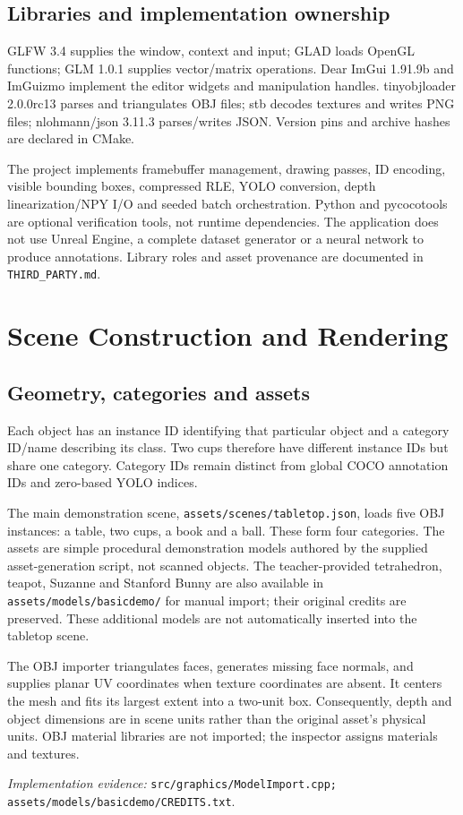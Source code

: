 \documentclass[12pt,a4paper]{article}
\newcommand{\code}[1]{{\small\nolinkurl{#1}}}
\newcommand{\source}[1]{\par{\raggedright\footnotesize\textit{Implementation evidence:} \code{#1}.\par}}
\begin{document}
\subsection{Libraries and implementation ownership}
GLFW 3.4 supplies the window, context and input; GLAD loads OpenGL functions; GLM 1.0.1 supplies vector/matrix operations. Dear ImGui 1.91.9b and ImGuizmo implement the editor widgets and manipulation handles. tinyobjloader 2.0.0rc13 parses and triangulates OBJ files; stb decodes textures and writes PNG files; nlohmann/json 3.11.3 parses/writes JSON. Version pins and archive hashes are declared in CMake.

The project implements framebuffer management, drawing passes, ID encoding, visible bounding boxes, compressed RLE, YOLO conversion, depth linearization/NPY I/O and seeded batch orchestration. Python and pycocotools are optional verification tools, not runtime dependencies. The application does not use Unreal Engine, a complete dataset generator or a neural network to produce annotations. Library roles and asset provenance are documented in \code{THIRD_PARTY.md}.

\section{Scene Construction and Rendering}
\subsection{Geometry, categories and assets}
Each object has an instance ID identifying that particular object and a category ID/name describing its class. Two cups therefore have different instance IDs but share one category. Category IDs remain distinct from global COCO annotation IDs and zero-based YOLO indices.

The main demonstration scene, \code{assets/scenes/tabletop.json}, loads five OBJ instances: a table, two cups, a book and a ball. These form four categories. The assets are simple procedural demonstration models authored by the supplied asset-generation script, not scanned objects. The teacher-provided tetrahedron, teapot, Suzanne and Stanford Bunny are also available in \code{assets/models/basicdemo/} for manual import; their original credits are preserved. These additional models are not automatically inserted into the tabletop scene.

The OBJ importer triangulates faces, generates missing face normals, and supplies planar UV coordinates when texture coordinates are absent. It centers the mesh and fits its largest extent into a two-unit box. Consequently, depth and object dimensions are in scene units rather than the original asset's physical units. OBJ material libraries are not imported; the inspector assigns materials and textures.
\source{src/graphics/ModelImport.cpp; assets/models/basicdemo/CREDITS.txt}
\end{document}

